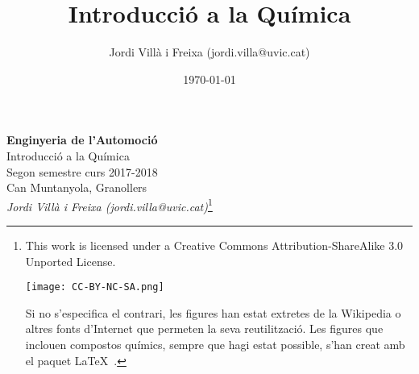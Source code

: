 \documentclass{book}
\title{Introducció a la Química}
\date{\today}
\author{Jordi Vill\`a i Freixa (jordi.villa@uvic.cat)}
\begin{document}
\thispagestyle{empty}

\begin{center}
{\LARGE \bf Enginyeria de l'Automoció}\\
{\large Introducció a la Química}\\
Segon semestre curs 2017-2018\\
Can Muntanyola, Granollers\\
\textit{Jordi Vill\`a i Freixa (jordi.villa@uvic.cat)}\footnote{This work is licensed under a Creative Commons Attribution-ShareAlike 3.0 Unported License.
  \begin{center}
    \texttt{[image: CC-BY-NC-SA.png]}
  \end{center}
  Si no s'especifica el contrari, les figures han estat extretes de la Wikipedia o altres fonts d'Internet que permeten la seva reutilització. Les figures que inclouen compostos químics, sempre que hagi estat possible, s'han creat amb el paquet \LaTeX\ 
    .}
\end{center}


\tableofcontents
\end{document}
